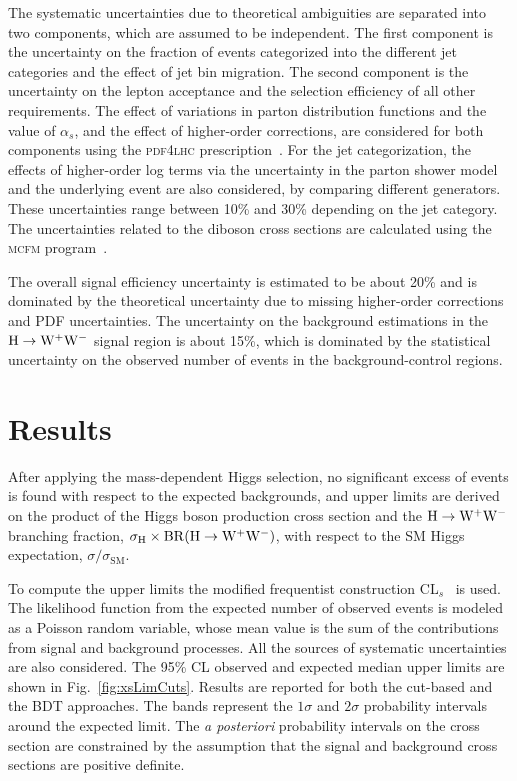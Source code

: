 \documentclass[11pt,twoside,a4paper,cmspaper,final,collab]{cms-tdr}
\begin{document}
The systematic uncertainties due to theoretical ambiguities are separated
into two components, which are assumed to be
independent. The first component is the uncertainty on the fraction of
events categorized into the different jet categories and the effect of jet bin migration.
The second component is the uncertainty on
the lepton acceptance and the selection efficiency of all other
requirements. The effect of variations in parton distribution functions and the
value of $\alpha_{s}$, and the effect of higher-order corrections,
are considered for both components using the \textsc{pdf4lhc}
prescription~\cite{Botje:2011sn,Alekhin:2011sk,Lai:2010vv,Martin:2009iq,Ball:2011mu}.
For the jet categorization, the effects of higher-order log terms via
the uncertainty in the parton shower model and the underlying event
are also considered, by comparing different generators. These uncertainties range
between 10\% and 30\% depending on the jet category.
The uncertainties related to the diboson
cross sections are calculated using the \textsc{mcfm} program~\cite{MCFM}.

The overall signal efficiency uncertainty is estimated to be about 20\%
and is dominated by the theoretical uncertainty due to missing
higher-order corrections and PDF uncertainties. The uncertainty on the background estimations
in the $\mathrm{H}\to\mathrm{W^+}{}\mathrm{W^-}$ signal region is about 15\%, which is dominated by the
statistical uncertainty on the observed number of events in the background-control regions.

\section{Results}
\label{sec:results}
After applying the mass-dependent Higgs selection, no significant
excess of events is found with respect to the expected backgrounds,
and upper limits are derived on the product of the Higgs boson
production cross section and the $\mathrm{H} \to \mathrm{W^+}{}\mathrm{W^-}$ branching fraction,
$\sigma_{\mathrm{H}} \times \mathrm{BR}(\mathrm{H} \to \mathrm{W^+}{}\mathrm{W^-})$, with respect to the
SM Higgs expectation, $\sigma/\sigma_\text{SM}$.

To compute the upper limits the modified frequentist construction
CL$_{s}$~\cite{Read1,junkcls,LHC-HCG} is used. The likelihood function from the
expected number of observed events is modeled as a Poisson random variable,
whose mean value is the sum of the contributions from signal and background
processes. All the sources of systematic uncertainties are also considered.
The 95\% CL observed and expected median upper limits are shown in
Fig.~\ref{fig:xsLimCuts}. Results are reported for both the
cut-based and the BDT approaches. The bands represent the $1 \sigma$ and
$2 \sigma$ probability intervals around the expected limit. The
\textit{a posteriori} probability intervals on the cross section are
constrained by the assumption that the signal and
background cross sections are positive definite.
\end{document}
